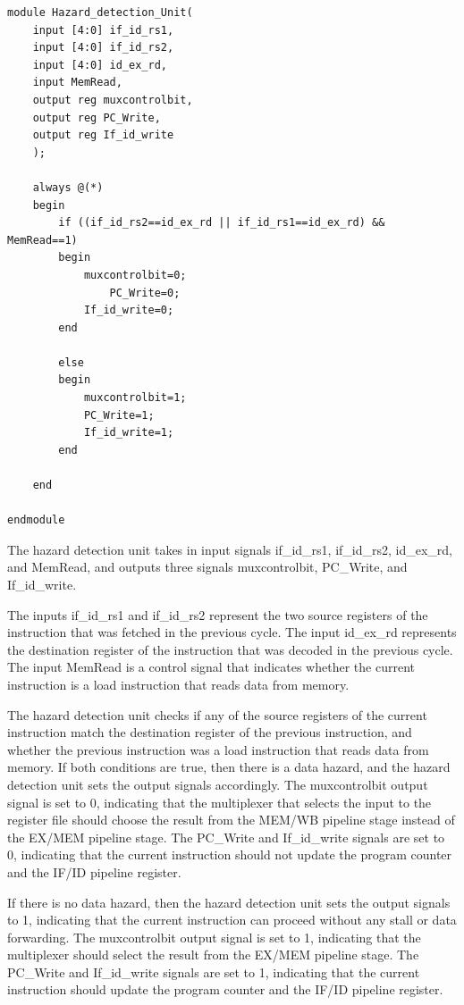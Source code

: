 \documentclass{article}
\begin{document}
\begin{lstlisting}[caption={IF/ID Register}, captionpos=b, language=RISC-V]
module Hazard_detection_Unit(
    input [4:0] if_id_rs1,
    input [4:0] if_id_rs2,
    input [4:0] id_ex_rd,
    input MemRead,
    output reg muxcontrolbit,
    output reg PC_Write,
    output reg If_id_write
    );
    
    always @(*)    
    begin 
        if ((if_id_rs2==id_ex_rd || if_id_rs1==id_ex_rd) &&  MemRead==1)
        begin
            muxcontrolbit=0;
                PC_Write=0;         
            If_id_write=0;
        end
        
        else 
        begin
            muxcontrolbit=1;
            PC_Write=1;
            If_id_write=1;
        end 
        
    end 
    
endmodule
\end{lstlisting}

The hazard detection unit takes in input signals if\_id\_rs1, if\_id\_rs2, id\_ex\_rd, and MemRead, and outputs three signals muxcontrolbit, PC\_Write, and If\_id\_write.

The inputs if\_id\_rs1 and if\_id\_rs2 represent the two source registers of the instruction that was fetched in the previous cycle. The input id\_ex\_rd represents the destination register of the instruction that was decoded in the previous cycle. The input MemRead is a control signal that indicates whether the current instruction is a load instruction that reads data from memory.

The hazard detection unit checks if any of the source registers of the current instruction match the destination register of the previous instruction, and whether the previous instruction was a load instruction that reads data from memory. If both conditions are true, then there is a data hazard, and the hazard detection unit sets the output signals accordingly. The muxcontrolbit output signal is set to 0, indicating that the multiplexer that selects the input to the register file should choose the result from the MEM/WB pipeline stage instead of the EX/MEM pipeline stage. The PC\_Write and If\_id\_write signals are set to 0, indicating that the current instruction should not update the program counter and the IF/ID pipeline register.

If there is no data hazard, then the hazard detection unit sets the output signals to 1, indicating that the current instruction can proceed without any stall or data forwarding. The muxcontrolbit output signal is set to 1, indicating that the multiplexer should select the result from the EX/MEM pipeline stage. The PC\_Write and If\_id\_write signals are set to 1, indicating that the current instruction should update the program counter and the IF/ID pipeline register.
\end{document}
